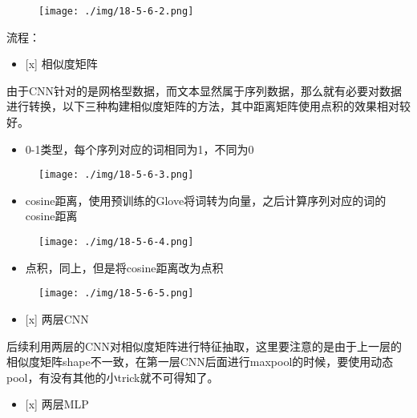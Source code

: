 \begin{figure}
\centering
\texttt{[image: ./img/18-5-6-2.png]}
\caption{}
\end{figure}

流程：

\begin{itemize}
\item
  {[}x{]} 相似度矩阵
\end{itemize}

由于CNN针对的是网格型数据，而文本显然属于序列数据，那么就有必要对数据进行转换，以下三种构建相似度矩阵的方法，其中距离矩阵使用点积的效果相对较好。

\begin{itemize}
\item
  0-1类型，每个序列对应的词相同为1，不同为0
\end{itemize}

\begin{figure}
\centering
\texttt{[image: ./img/18-5-6-3.png]}
\caption{}
\end{figure}

\begin{itemize}
\item
  cosine距离，使用预训练的Glove将词转为向量，之后计算序列对应的词的cosine距离
\end{itemize}

\begin{figure}
\centering
\texttt{[image: ./img/18-5-6-4.png]}
\caption{}
\end{figure}

\begin{itemize}
\item
  点积，同上，但是将cosine距离改为点积
\end{itemize}

\begin{figure}
\centering
\texttt{[image: ./img/18-5-6-5.png]}
\caption{}
\end{figure}

\begin{itemize}
\item
  {[}x{]} 两层CNN
\end{itemize}

后续利用两层的CNN对相似度矩阵进行特征抽取，这里要注意的是由于上一层的相似度矩阵shape不一致，在第一层CNN后面进行maxpool的时候，要使用动态pool，有没有其他的小trick就不可得知了。

\begin{itemize}
\item
  {[}x{]} 两层MLP
\end{itemize}

